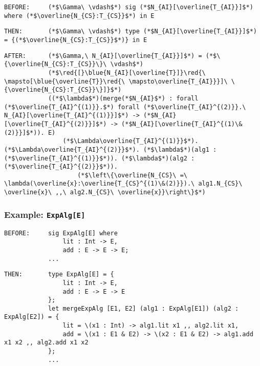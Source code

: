 \documentclass{article}
\newcommand{\red}[1]{\textcolor{red}{#1}}
\newcommand{\blue}[1]{\textcolor{blue}{#1}}
\begin{document}
\begin{spacing}{1.1}
\begin{lstlisting}[numbers=none]
BEFORE:     (*$\Gamma\ \vdash$*) sig (*$N_{AI}[\overline{T_{AI}}]$*) where (*$\overline{N_{CS}:T_{CS}}$*) in E
\end{lstlisting}
\begin{lstlisting}[numbers=none]
THEN:       (*$\Gamma\ \vdash$*) type (*$N_{AI}[\overline{T_{AI}}]$*) = {(*$\overline{N_{CS}:T_{CS}}$*)} in E
\end{lstlisting}
\begin{lstlisting}[numbers=none]
AFTER:      (*$\Gamma,\ N_{AI}[\overline{T_{AI}}]$*) = (*$\{\overline{N_{CS}:T_{CS}}\}\ \vdash$*)
            (*$\red{[}\blue{N_{AI}[\overline{T}]}\red{\ \mapsto[\blue{\overline{T}}\red{\ \mapsto\overline{T_{AI}}}]\ \{\overline{N_{CS}:T_{CS}}\}]}$*)
            ((*$\lambda$*)(merge(*$N_{AI}$*) : forall (*$\overline{T_{AI}^{(1)}}.$*) forall (*$\overline{T_{AI}^{(2)}}.\ N_{AI}[\overline{T_{AI}^{(1)}}]$*) -> (*$N_{AI}[\overline{T_{AI}^{(2)}}]$*) -> (*$N_{AI}[\overline{T_{AI}^{(1)\&(2)}}]$*)). E)
                (*$\Lambda\overline{T_{AI}^{(1)}}$*). (*$\Lambda\overline{T_{AI}^{(2)}}$*). (*$\lambda$*)(alg1 : (*$\overline{T_{AI}^{(1)}}$*)). (*$\lambda$*)(alg2 : (*$\overline{T_{AI}^{(2)}}$*)).
                    (*$\left\{\overline{N_{CS}\ =\ \lambda(\overline{x}:\overline{T_{CS}^{(1)\&(2)}}).\ alg1.N_{CS}\ \overline{x}\ ,,\ alg2.N_{CS}\ \overline{x}}\right\}$*)
\end{lstlisting}

\subsubsection{Example: \lstinline{ExpAlg[E]}}

\begin{lstlisting}[numbers=none]
BEFORE:     sig ExpAlg[E] where
                lit : Int -> E,
                add : E -> E -> E;
            ...
\end{lstlisting}
\begin{lstlisting}[numbers=none]
THEN:       type ExpAlg[E] = {
                lit : Int -> E,
                add : E -> E -> E
            };
            let mergeExpAlg [E1, E2] (alg1 : ExpAlg[E1]) (alg2 : ExpAlg[E2]) = {
                lit = \(x1 : Int) -> alg1.lit x1 ,, alg2.lit x1,
                add = \(x1 : E1 & E2) -> \(x2 : E1 & E2) -> alg1.add x1 x2 ,, alg2.add x1 x2
            };
            ...
\end{lstlisting}

\newpage


\end{spacing}
\end{document}
